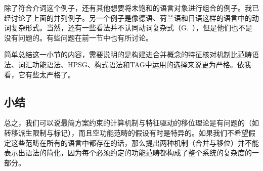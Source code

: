 除了符合介词这个例子，还有其他想要将未饱和的语言对象进行组合的例子。我已经讨论了上面的并列例子。另一个例子是像德语、荷兰语和日语这样的语言中的动词复杂形式。当然，还有一些看法并不认同动词复杂式（G.\ \citealp{GMueller98a,Wurmbrand2003b}），但是他们也不是没有问题的。有些问题在前一节中也有所讨论。

简单总结这一小节的内容，需要说明的是构建进合并概念的特征核对机制比范畴语法、词汇功能语法、HPSG、构式语法和TAG中运用的选择来说更为严格。依我看，它有些太严格了。

\subsection{小结}

总之，我们可以说最简方案约束的计算机制与特征驱动的移位理论是有问题的（如转移派生限制与标记），而且空功能范畴的假设有时是特异的。如果我们不希望假定这些范畴在所有的语言中都存在的话，那么提出两种机制（合并与移位）并不能表示出语法的简化，因为每个必须约定的功能范畴都构成了整个系统的复杂度的一部分。

